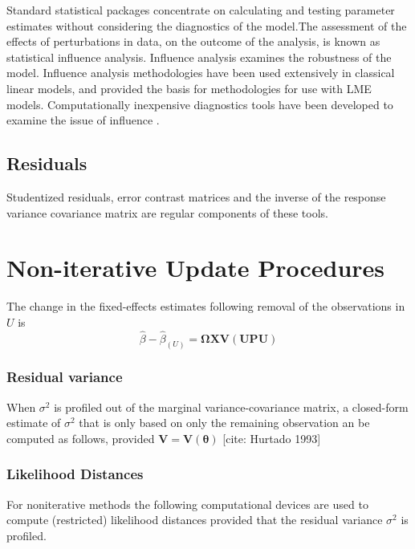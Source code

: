 \documentclass[12pt, a4paper]{report}
\theoremstyle{plain}
\theoremstyle{definition}
\theoremstyle{remark}
\begin{document}
Standard statistical packages concentrate on calculating and testing parameter estimates without considering the diagnostics of the model.The assessment of the effects of perturbations in data, on the outcome of the analysis, is known as statistical influence analysis. Influence analysis examines the robustness of the model. Influence analysis methodologies have been used extensively in classical linear models, and provided the basis for methodologies for use with LME models.
Computationally inexpensive diagnostics tools have been developed to examine the issue of influence \citep{Zewotir}.

\subsection*{Residuals}
Studentized residuals, error contrast matrices and the inverse of the response variance covariance matrix are regular components of these tools.






\section{Non-iterative Update Procedures}


The change in the fixed-effects estimates following removal of the observations in $U$ is
\[ \hat{\beta} - \hat{\beta}_{(U)} = \boldsymbol{\Omega}\boldsymbol{X}\boldsymbol{V}
\left( \boldsymbol{U} \boldsymbol{P}\boldsymbol{U}\right)   \]
\subsubsection{Residual variance}
When $\sigma^2$ is profiled out of the marginal variance-covariance matrix, a closed-form estimate of $\sigma^2$ that is only based on only the remaining observation
an be computed as follows, provided $\boldsymbol{V} = \boldsymbol{V}(\boldsymbol{\theta}) $
[cite: Hurtado 1993]

\subsubsection{Likelihood Distances}
For noniterative methods the following computational devices are used to compute (restricted) likelihood distances provided that the residual variance
$\sigma^2$ is profiled.
\end{document}
